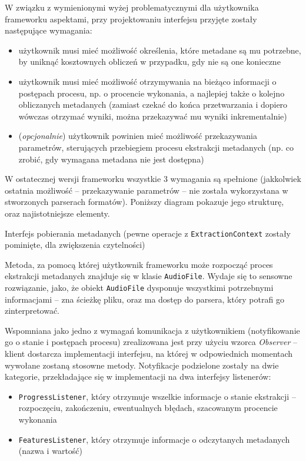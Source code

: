 W związku z wymienionymi wyżej problematycznymi dla użytkownika frameworku aspektami, przy
projektowaniu interfejsu przyjęte zostały następujące wymagania:

\begin{itemize}

  \item użytkownik musi mieć możliwość określenia, które metadane są mu potrzebne, by uniknąć
kosztownych obliczeń w przypadku, gdy nie są one konieczne

  \item użytkownik musi mieć możliwość otrzymywania na bieżąco informacji o postępach procesu, np. o
procencie wykonania, a najlepiej także o kolejno obliczanych metadanych (zamiast czekać do końca
przetwarzania i dopiero wówczas otrzymać wyniki, można przekazywać mu wyniki inkrementalnie)

  \item (\emph{opcjonalnie}) użytkownik powinien mieć możliwość przekazywania parametrów,
sterujących przebiegiem procesu ekstrakcji metadanych (np. co zrobić, gdy wymagana metadana nie jest
dostępna)

\end{itemize}

W ostatecznej wersji frameworku wszystkie 3 wymagania są spełnione (jakkolwiek ostatnia możliwość --
przekazywanie parametrów -- nie została wykorzystana w stworzonych parserach formatów). Poniższy
diagram pokazuje jego strukturę, oraz najistotniejsze elementy.

{Interfejs pobierania metadanych (pewne operacje z \texttt{ExtractionContext} zostały pominięte, dla
zwiększenia czytelności)}


Metoda, za pomocą której użytkownik frameworku może rozpocząć proces ekstrakcji metadanych znajduje
się w klasie \texttt{AudioFile}. Wydaje się to sensowne rozwiązanie, jako, że obiekt
\texttt{AudioFile} dysponuje wszystkimi potrzebnymi informacjami -- zna ścieżkę pliku, oraz ma
dostęp do parsera, który potrafi go zinterpretować.

Wspomniana jako jedno z wymagań komunikacja z użytkownikiem (notyfikowanie go o stanie i postępach
procesu) zrealizowana jest przy użyciu wzorca \emph{Observer} -- klient dostarcza implementacji
interfejsu, na której w odpowiednich momentach wywołane zostaną stosowne metody. Notyfikacje
podzielone zostały na dwie kategorie, przekładające się w implementacji na dwa interfejsy
listenerów:

\begin{itemize}

  \item \texttt{ProgressListener}, który otrzymuje wszelkie informacje o stanie ekstrakcji --
    rozpoczęciu, zakończeniu, ewentualnych błędach, szacowanym procencie wykonania

  \item \texttt{FeaturesListener}, który otrzymuje informacje o odczytanych metadanych (nazwa i
wartość)

\end{itemize}

